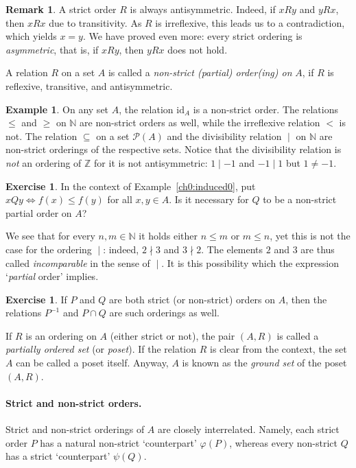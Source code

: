 \documentclass[12pt,notitlepage]{article}
\theoremstyle{plain}
\theoremstyle{definition}
\newtheorem{exc}[thm]{Exercise}
\newtheorem{exm}[thm]{Example}
\newtheorem{rem}[thm]{Remark}
\theoremstyle{plain}
\newcommand{\N}{\mathbb{N}}
\newcommand{\Z}{\mathbb{Z}}
\newcommand{\sbs}{\subseteq}
\newcommand{\mP}{\mathcal{P}}
\renewcommand{\phi}{\varphi}
\newcommand{\id}{\mathrm{id}}
\newcommand{\1}{\mathbf{1}}
\newcommand{\0}{\mathbf{0}}
\newcommand{\dvd}{\mathop{\mid}}
\newcommand{\ndvd}{\mathop{\nmid}}
\begin{document}
\begin{rem}\label{ch0:sord_asym}
A strict order $R$ is always antisymmetric. Indeed, if $x R y$ and $y R x$, then $x R x$ due to transitivity. As $R$ is irreflexive, this leads us to a contradiction, which yields $x = y$. We have proved even more: every strict ordering is \emph{asymmetric}, that is, if $x R y$, then $y R x$ does not hold.
\end{rem}

A relation $R$ on a set $A$ is called a \emph{non-strict (partial) order(ing) on} $A$, if $R$ is reflexive, transitive, and antisymmetric.

\begin{exm}
On any set $A$, the relation $\id_A$ is a non-strict order. The relations ${\leq}$ and ${\geq}$ on $\N$ are non-strict orders as well, while the irreflexive relation ${<}$ is not. The relation ${\sbs}$ on a set $\mP(A)$ and the divisibility relation ${\dvd}$ on $\N$ are non-strict orderings of the respective sets. Notice that the divisibility relation is \emph{not}  an ordering of $\Z$ for it is not antisymmetric: $1 \dvd -1$ and $-1 \dvd 1$ but $1 \neq -1$.
\end{exm}

\begin{exc}
In the context of Example~\ref{ch0:induced0}, put $x Q y \iff f(x) \leq f(y)$ for all $x, y \in A$. Is it necessary for $Q$ to be a non-strict partial order on $A$?
\end{exc}

We see that for every $n,m \in \N$ it holds either $n \leq m$ or $m \leq n$, yet this is not the case for the ordering ${\dvd}$: indeed, $2 \ndvd 3$ and $3 \ndvd 2$. The elements $2$ and $3$ are thus called \emph{incomparable} in the sense of ${\dvd}$. It is this possibility which the expression `\emph{partial} order' implies.

\begin{exc}
If $P$ and $Q$ are both strict (or non-strict) orders on $A$, then the relations $P^{-1}$ and $P \cap Q$ are such orderings as well.
\end{exc}

If $R$ is an ordering on $A$ (either strict or not), the pair $(A,R)$ is called a \emph{partially ordered set} (or \emph{poset}). If the relation $R$ is clear from the context, the set $A$ can be called a poset itself. Anyway, $A$ is known as the \emph{ground set} of the poset $(A, R)$.

\paragraph{Strict and non-strict orders.}
Strict and non-strict orderings of $A$ are closely interrelated. Namely, each strict order $P$ has a natural non-strict `counterpart' $\phi(P)$, whereas every non-strict $Q$ has a strict `counterpart' $\psi(Q)$.
\end{document}
